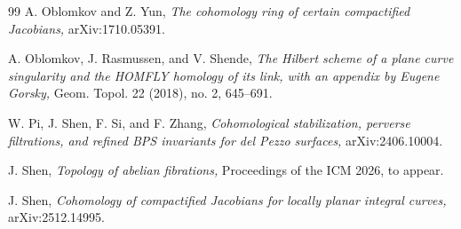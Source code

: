 \documentclass[11pt]{amsart}
\theoremstyle{plain}
\theoremstyle{definition}
\theoremstyle{remark}
\newcommand{\CM}{{\mathcal M}}
\begin{document}
\begin{thebibliography}{99}
 A. Oblomkov and Z. Yun, {\em The cohomology ring of certain compactified Jacobians,} arXiv:1710.05391.

 A. Oblomkov, J. Rasmussen, and V. Shende, {\em The Hilbert scheme of a plane curve singularity and the HOMFLY homology of its link, with an appendix by Eugene Gorsky,} Geom. Topol. 22 (2018), no. 2, 645--691.





 W. Pi, J. Shen, F. Si, and F. Zhang, {\em Cohomological stabilization, perverse filtrations, and refined BPS invariants for del Pezzo surfaces,} arXiv:2406.10004.





 J. Shen, {\em Topology of abelian fibrations,} Proceedings of the ICM 2026, to appear.

 J. Shen, {\em Cohomology of compactified Jacobians for locally planar integral curves,} arXiv:2512.14995.


\end{thebibliography}
\end{document}
